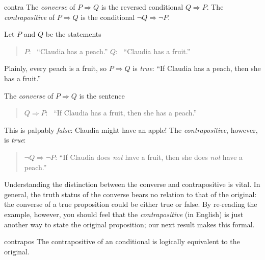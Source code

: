\goodbreak



\begin{defn}{}{contra}
	The \emph{converse} of $P\Longrightarrow Q$ is the reversed conditional $Q\Longrightarrow P$.\smallbreak
	The \emph{contrapositive} of $P\Longrightarrow Q$ is the conditional $\neg Q\Longrightarrow\neg P$.
\end{defn}

\begin{example}{}{}
	Let $P$ and $Q$ be the statements
	\begin{quote}
	  $P$: \ ``Claudia has a peach.''\qquad\qquad
	  $Q$: \ ``Claudia has a fruit.''
	\end{quote}
	Plainly, every peach is a fruit, so $P\Longrightarrow Q$ is \emph{true}: ``If Claudia has a peach, then she has a fruit.''
	\par
	The \emph{converse} of $P\Longrightarrow Q$ is the sentence
	\begin{quote}
	  $Q\Longrightarrow P$: \ ``If Claudia has a fruit, then she has a peach.''
	\end{quote}
	This is palpably \emph{false}: Claudia might have an apple! The \emph{contrapositive}, however, is \emph{true}:
	\begin{quote}
	  $\neg Q\Longrightarrow \neg P$: ``If Claudia does \emph{not} have a fruit, then she does \emph{not} have a peach.''
	\end{quote} 
\end{example}

Understanding the distinction between the converse and contrapositive is vital. In general, the truth status of the converse bears no relation to that of the original: the converse of a true proposition could be either true or false. By re-reading the example, however, you should feel that the \emph{contrapositive} (in English) is just another way to state the original proposition; our next result makes this formal.

\begin{thm}{}{contrapos}
	The contrapositive of an conditional is logically equivalent to the original.
\end{thm}

